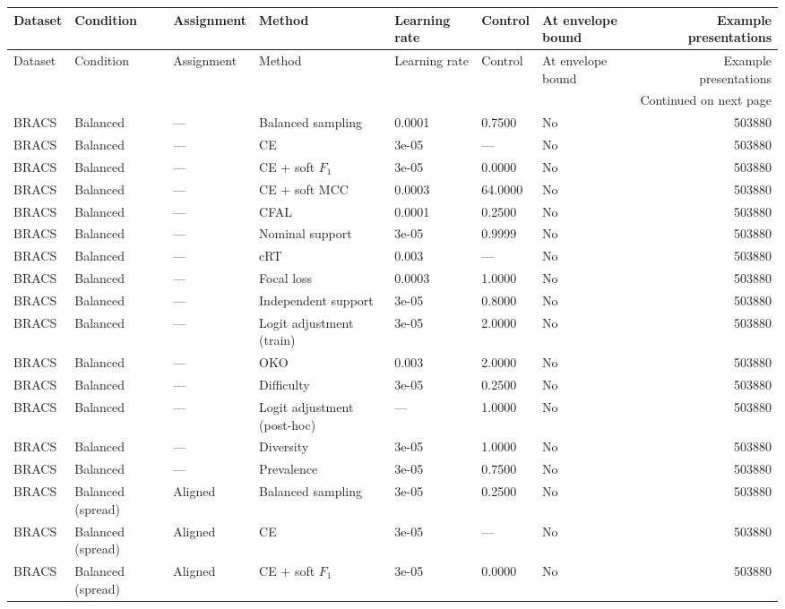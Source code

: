 \begin{longtable}{lllllllr}
\toprule
Dataset & Condition & Assignment & Method & Learning rate & Control & At envelope bound & Example presentations \\
\midrule
\endfirsthead
\toprule
Dataset & Condition & Assignment & Method & Learning rate & Control & At envelope bound & Example presentations \\
\midrule
\endhead
\midrule
\multicolumn{8}{r}{Continued on next page} \\
\midrule
\endfoot
\bottomrule
\endlastfoot
BRACS & Balanced & --- & Balanced sampling & 0.0001 & 0.7500 & No & 503880 \\
BRACS & Balanced & --- & CE & 3e-05 & --- & No & 503880 \\
BRACS & Balanced & --- & CE + soft $F_1$ & 3e-05 & 0.0000 & No & 503880 \\
BRACS & Balanced & --- & CE + soft MCC & 0.0003 & 64.0000 & No & 503880 \\
BRACS & Balanced & --- & CFAL & 0.0001 & 0.2500 & No & 503880 \\
BRACS & Balanced & --- & Nominal support & 3e-05 & 0.9999 & No & 503880 \\
BRACS & Balanced & --- & cRT & 0.003 & --- & No & 503880 \\
BRACS & Balanced & --- & Focal loss & 0.0003 & 1.0000 & No & 503880 \\
BRACS & Balanced & --- & Independent support & 3e-05 & 0.8000 & No & 503880 \\
BRACS & Balanced & --- & Logit adjustment (train) & 3e-05 & 2.0000 & No & 503880 \\
BRACS & Balanced & --- & OKO & 0.003 & 2.0000 & No & 503880 \\
BRACS & Balanced & --- & Difficulty & 3e-05 & 0.2500 & No & 503880 \\
BRACS & Balanced & --- & Logit adjustment (post-hoc) & --- & 1.0000 & No & 503880 \\
BRACS & Balanced & --- & Diversity & 3e-05 & 1.0000 & No & 503880 \\
BRACS & Balanced & --- & Prevalence & 3e-05 & 0.7500 & No & 503880 \\
BRACS & Balanced (spread) & Aligned & Balanced sampling & 3e-05 & 0.2500 & No & 503880 \\
BRACS & Balanced (spread) & Aligned & CE & 3e-05 & --- & No & 503880 \\
BRACS & Balanced (spread) & Aligned & CE + soft $F_1$ & 3e-05 & 0.0000 & No & 503880 \\

\end{longtable}
